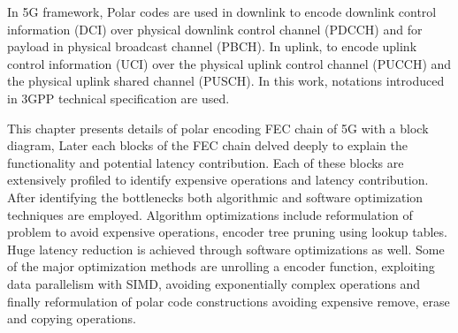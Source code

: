 In 5G framework, Polar codes are used in downlink to encode downlink control information (DCI) over physical downlink control channel (PDCCH) and for payload in physical broadcast channel (PBCH). In uplink, to encode uplink control information (UCI) over the physical uplink control channel (PUCCH) and the physical uplink shared channel (PUSCH). In this work, notations introduced in 3GPP technical specification\cite{3gpp.38.212} are used.

This chapter presents details of polar encoding FEC chain of 5G with a block diagram, Later each blocks of the FEC chain delved deeply to explain the functionality and potential latency contribution. Each of these blocks are extensively profiled to identify expensive operations and latency contribution. After identifying the bottlenecks both algorithmic and software optimization techniques are employed. Algorithm optimizations include reformulation of problem to avoid expensive operations, encoder tree pruning using lookup tables. Huge latency reduction is achieved through software optimizations as well. Some of the major optimization methods are unrolling a encoder function, exploiting data parallelism with SIMD, avoiding exponentially complex operations and finally reformulation of polar code constructions avoiding expensive remove, erase and copying operations.


